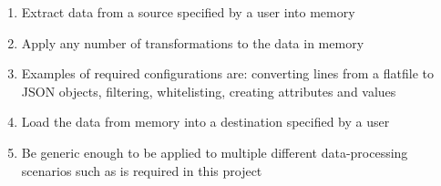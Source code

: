 \begin{enumerate}
    \item Extract data from a source specified by a user into memory
    \item Apply any number of transformations to the data in memory
    \item Examples of required configurations are: converting lines from a flatfile to JSON objects, filtering, whitelisting, creating attributes and values
    \item Load the data from memory into a destination specified by a user
    \item Be generic enough to be applied to multiple different data-processing scenarios such as is required in this project
\end{enumerate}
